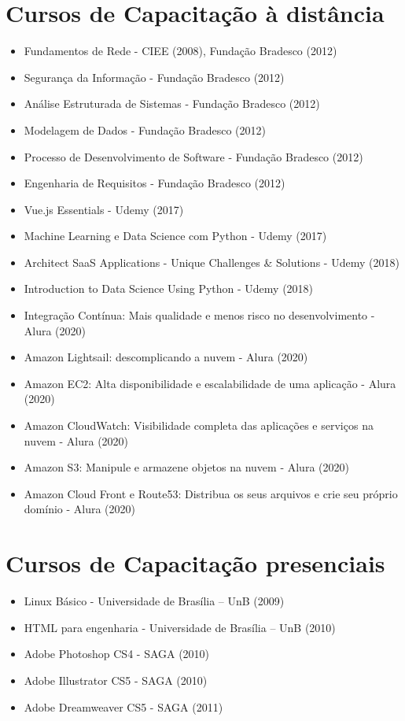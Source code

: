 \section{Cursos de Capacitação à distância}
\begin{itemize}
    \item Fundamentos de Rede - CIEE (2008), Fundação Bradesco (2012)
    \item Segurança da Informação - Fundação Bradesco (2012)
    \item Análise Estruturada de Sistemas - Fundação Bradesco (2012)
    \item Modelagem de Dados - Fundação Bradesco (2012)
    \item Processo de Desenvolvimento de Software - Fundação Bradesco (2012)
    \item Engenharia de Requisitos - Fundação Bradesco (2012)
    \item Vue.js Essentials - Udemy (2017)
    \item Machine Learning e Data Science com Python - Udemy (2017)
    \item Architect SaaS Applications - Unique Challenges & Solutions - Udemy (2018)
    \item Introduction to Data Science Using Python - Udemy (2018)
    \item Integração Contínua: Mais qualidade e menos risco no desenvolvimento - Alura (2020)
    \item Amazon Lightsail: descomplicando a nuvem - Alura (2020)
    \item Amazon EC2: Alta disponibilidade e escalabilidade de uma aplicação - Alura (2020)
    \item Amazon CloudWatch: Visibilidade completa das aplicações e serviços na nuvem - Alura (2020)
    \item Amazon S3: Manipule e armazene objetos na nuvem - Alura (2020)
    \item Amazon Cloud Front e Route53: Distribua os seus arquivos e crie seu próprio domínio - Alura (2020)
\end{itemize}

\section{Cursos de Capacitação presenciais}
\begin{itemize}
    \item Linux Básico - Universidade de Brasília – UnB (2009)
    \item HTML para engenharia - Universidade de Brasília – UnB (2010)
    \item Adobe Photoshop CS4 - SAGA (2010)
    \item Adobe Illustrator CS5 - SAGA (2010)
    \item Adobe Dreamweaver CS5 - SAGA (2011)
\end{itemize}